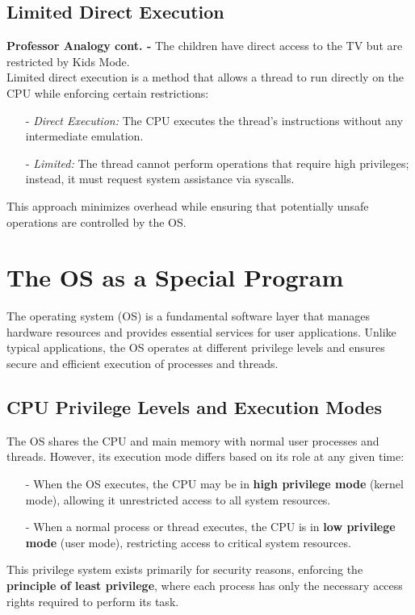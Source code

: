 \subsection{Limited Direct Execution}
\textbf{Professor Analogy cont. -} The children have direct access to the TV but are restricted by Kids Mode. \\
Limited direct execution is a method that allows a thread to run directly on the CPU while enforcing certain restrictions:
\begin{itemize}
  \item[-] \emph{Direct Execution:} The CPU executes the thread's instructions without any intermediate emulation.
  \item[-] \emph{Limited:} The thread cannot perform operations that require high privileges; instead, it must request system assistance via syscalls.
\end{itemize}

This approach minimizes overhead while ensuring that potentially unsafe operations are controlled by the OS.
\section{The OS as a Special Program}
The operating system (OS) is a fundamental software layer that manages hardware resources and provides essential services for user applications. Unlike typical applications, the OS operates at different privilege levels and ensures secure and efficient execution of processes and threads.

\subsection{CPU Privilege Levels and Execution Modes}

The OS shares the CPU and main memory with normal user processes and threads. However, its execution mode differs based on its role at any given time:

\begin{itemize}
  \item[-] When the OS executes, the CPU may be in \textbf{high privilege mode} (kernel mode), allowing it unrestricted access to all system resources.
\item[-] When a normal process or thread executes, the CPU is in \textbf{low privilege mode} (user mode), restricting access to critical system resources.
\end{itemize}

This privilege system exists primarily for security reasons, enforcing the \textbf{principle of least privilege}, where each process has only the necessary access rights required to perform its task. 

